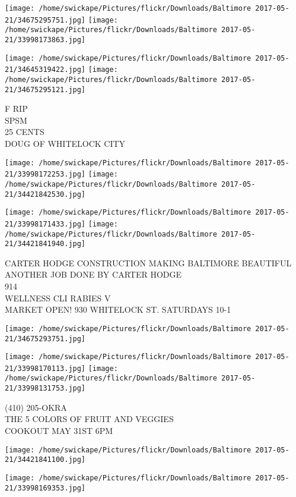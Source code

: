 \documentclass[10pt,letterpaper]{article}
\begin{document}
\texttt{[image: /home/swickape/Pictures/flickr/Downloads/Baltimore 2017-05-21/34675295751.jpg]}
\texttt{[image: /home/swickape/Pictures/flickr/Downloads/Baltimore 2017-05-21/33998173863.jpg]}

\texttt{[image: /home/swickape/Pictures/flickr/Downloads/Baltimore 2017-05-21/34645319422.jpg]}
\texttt{[image: /home/swickape/Pictures/flickr/Downloads/Baltimore 2017-05-21/34675295121.jpg]}

F RIP\\
SPSM\\
25 CENTS\\
DOUG OF WHITELOCK CITY
\pagebreak

\texttt{[image: /home/swickape/Pictures/flickr/Downloads/Baltimore 2017-05-21/33998172253.jpg]}
\texttt{[image: /home/swickape/Pictures/flickr/Downloads/Baltimore 2017-05-21/34421842530.jpg]}

\texttt{[image: /home/swickape/Pictures/flickr/Downloads/Baltimore 2017-05-21/33998171433.jpg]}
\texttt{[image: /home/swickape/Pictures/flickr/Downloads/Baltimore 2017-05-21/34421841940.jpg]}

CARTER HODGE CONSTRUCTION MAKING BALTIMORE BEAUTIFUL ANOTHER JOB DONE BY CARTER HODGE\\
914\\
WELLNESS CLI RABIES V\\
MARKET OPEN! 930 WHITELOCK ST. SATURDAYS 10{-}1
\pagebreak

\texttt{[image: /home/swickape/Pictures/flickr/Downloads/Baltimore 2017-05-21/34675293751.jpg]}

\vspace{0.25in}
\texttt{[image: /home/swickape/Pictures/flickr/Downloads/Baltimore 2017-05-21/33998170113.jpg]}
\texttt{[image: /home/swickape/Pictures/flickr/Downloads/Baltimore 2017-05-21/33998131753.jpg]}

(410) 205{-}OKRA\\
THE 5 COLORS OF FRUIT AND VEGGIES\\
COOKOUT MAY 31ST 6PM
\pagebreak

\texttt{[image: /home/swickape/Pictures/flickr/Downloads/Baltimore 2017-05-21/34421841100.jpg]}

\vspace{0.25in}
\texttt{[image: /home/swickape/Pictures/flickr/Downloads/Baltimore 2017-05-21/33998169353.jpg]}
\end{document}
